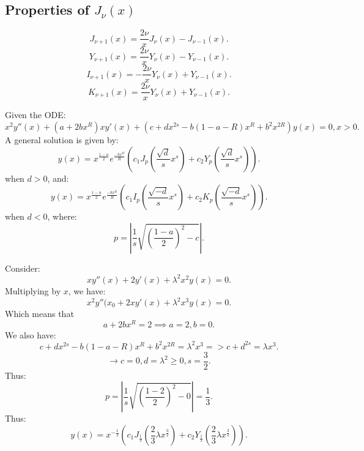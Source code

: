 \documentclass[../main/main.tex]{subfiles}
\begin{document}
\subsection{Properties of $J_\nu(x)$ }
\[
	J_{\nu+1}(x) = \frac{2\nu}{x}J_\nu(x) - J_{\nu-1}(x)
.\] \[
	Y_{\nu+1}(x) = \frac{2\nu}{x}Y_\nu(x) - Y_{\nu-1}(x)
 .\] \[ 
	I_{\nu+1}(x) = -\frac{2\nu}{x}Y_\nu(x) + Y_{\nu-1}(x)
 .\]\[ 
	K_{\nu+1}(x) = \frac{2\nu}{x}Y_\nu(x) + Y_{\nu-1}(x)
 .\]  
\begin{theorem}
	Given the ODE: \[
		x^2y''(x) + (a+2bx^{R})xy'(x) + (c+dx^{2s}-b(1-a-R)x^{R}+b^2x^{2R})y(x)=0, x>0
	.\] A general solution is given by: \[
	y(x) = x^{\frac{1-a}{2}}e^{\frac{-bx^{R}}{R}}\left( c_1J_p\left( \frac{\sqrt{d} }{s}x^{s} \right) +c_2 Y_p\left( \frac{\sqrt{d} }{s}x^{s} \right)  \right) 
	.\] when $d>0$, and:  \[
	y(x) = x^{\frac{1-a}{2}}e^{\frac{-bx^{R}}{R}}\left( c_1I_p\left( \frac{\sqrt{-d} }{s}x^{s} \right) +c_2 K_p\left( \frac{\sqrt{-d} }{s}x^{s} \right)  \right) 
	.\] when $d<0$, where: \[
	p = \left| \frac{1}{s}\sqrt{\left( \frac{1-a}{2} \right) ^2-c}  \right| 
	.\] 
\end{theorem}
\begin{example}
	Consider: \[
		xy''(x) + 2y'(x) + \lambda^2x^2y(x) = 0
	.\] Multiplying by $x$, we have: \[
	x^2y''(x_0 + 2xy'(x) + \lambda^2x^{3}y(x) = 0
	.\] Which means that \[a+2bx^{R}=2\implies a=2,b=0.\] We also have: \[
	c+dx^{2s}-b(1-a-R)x^{R}+b^2x^{2R}=\lambda^2x^{3} => c+d^{2s}=\lambda x^{3}
	.\] \[
\to  c=0, d=\lambda^2\ge 0, s = \frac{3}{2}	
	.\] Thus: \[
	p = \left| \frac{1}{s}\sqrt{\left( \frac{1-2}{2} \right)^2-0 }  \right| =\frac{1}{3}
	.\] Thus: \[
	y(x) = x^{-\frac{1}{2}}\left( c_1J_{\frac{1}{3}}\left( \frac{2}{3}\lambda x^{\frac{3}{2}} \right) +c_2 Y_{\frac{1}{3}}\left( \frac{2}{3}\lambda x^{\frac{3}{2}} \right)  \right) 
	.\] 
\end{example}
\end{document}
